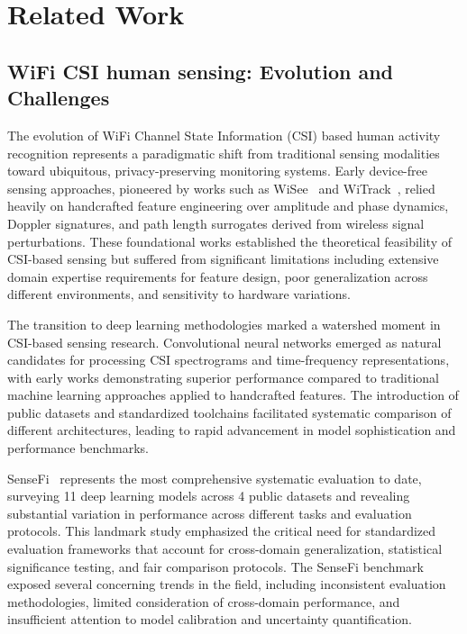 \documentclass[journal]{IEEEtran}
\begin{document}
\section{Related Work}

\subsection{WiFi CSI human sensing: Evolution and Challenges}

The evolution of WiFi Channel State Information (CSI) based human activity recognition represents a paradigmatic shift from traditional sensing modalities toward ubiquitous, privacy-preserving monitoring systems. Early device-free sensing approaches, pioneered by works such as WiSee~\cite{pu2013whole} and WiTrack~\cite{adib2013see}, relied heavily on handcrafted feature engineering over amplitude and phase dynamics, Doppler signatures, and path length surrogates derived from wireless signal perturbations. These foundational works established the theoretical feasibility of CSI-based sensing but suffered from significant limitations including extensive domain expertise requirements for feature design, poor generalization across different environments, and sensitivity to hardware variations.

The transition to deep learning methodologies marked a watershed moment in CSI-based sensing research. Convolutional neural networks emerged as natural candidates for processing CSI spectrograms and time-frequency representations, with early works demonstrating superior performance compared to traditional machine learning approaches applied to handcrafted features. The introduction of public datasets and standardized toolchains facilitated systematic comparison of different architectures, leading to rapid advancement in model sophistication and performance benchmarks.

SenseFi~\cite{yang2023sensefi} represents the most comprehensive systematic evaluation to date, surveying 11 deep learning models across 4 public datasets and revealing substantial variation in performance across different tasks and evaluation protocols. This landmark study emphasized the critical need for standardized evaluation frameworks that account for cross-domain generalization, statistical significance testing, and fair comparison protocols. The SenseFi benchmark exposed several concerning trends in the field, including inconsistent evaluation methodologies, limited consideration of cross-domain performance, and insufficient attention to model calibration and uncertainty quantification.
\end{document}
